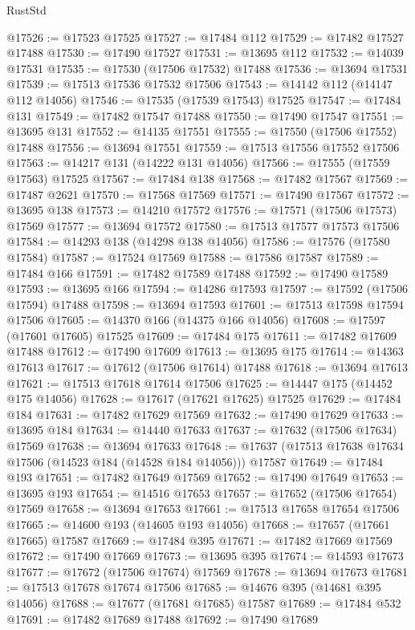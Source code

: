 \begin{lexlean}{RustStd}
\begin{coremodule}
@17526 := @17523 @17525
@17527 := @17484 @112
@17529 := @17482 @17527 @17488
@17530 := @17490 @17527
@17531 := @13695 @112
@17532 := @14039 @17531
@17535 := @17530 (@17506 @17532) @17488
@17536 := @13694 @17531
@17539 := @17513 @17536 @17532 @17506
@17543 := @14142 @112 (@14147 @112 @14056)
@17546 := @17535 (@17539 @17543) @17525
@17547 := @17484 @131
@17549 := @17482 @17547 @17488
@17550 := @17490 @17547
@17551 := @13695 @131
@17552 := @14135 @17551
@17555 := @17550 (@17506 @17552) @17488
@17556 := @13694 @17551
@17559 := @17513 @17556 @17552 @17506
@17563 := @14217 @131 (@14222 @131 @14056)
@17566 := @17555 (@17559 @17563) @17525
@17567 := @17484 @138
@17568 := @17482 @17567
@17569 := @17487 @2621
@17570 := @17568 @17569
@17571 := @17490 @17567
@17572 := @13695 @138
@17573 := @14210 @17572
@17576 := @17571 (@17506 @17573) @17569
@17577 := @13694 @17572
@17580 := @17513 @17577 @17573 @17506
@17584 := @14293 @138 (@14298 @138 @14056)
@17586 := @17576 (@17580 @17584)
@17587 := @17524 @17569
@17588 := @17586 @17587
@17589 := @17484 @166
@17591 := @17482 @17589 @17488
@17592 := @17490 @17589
@17593 := @13695 @166
@17594 := @14286 @17593
@17597 := @17592 (@17506 @17594) @17488
@17598 := @13694 @17593
@17601 := @17513 @17598 @17594 @17506
@17605 := @14370 @166 (@14375 @166 @14056)
@17608 := @17597 (@17601 @17605) @17525
@17609 := @17484 @175
@17611 := @17482 @17609 @17488
@17612 := @17490 @17609
@17613 := @13695 @175
@17614 := @14363 @17613
@17617 := @17612 (@17506 @17614) @17488
@17618 := @13694 @17613
@17621 := @17513 @17618 @17614 @17506
@17625 := @14447 @175 (@14452 @175 @14056)
@17628 := @17617 (@17621 @17625) @17525
@17629 := @17484 @184
@17631 := @17482 @17629 @17569
@17632 := @17490 @17629
@17633 := @13695 @184
@17634 := @14440 @17633
@17637 := @17632 (@17506 @17634) @17569
@17638 := @13694 @17633
@17648 := @17637 (@17513 @17638 @17634 @17506 (@14523 @184 (@14528 @184 @14056))) @17587
@17649 := @17484 @193
@17651 := @17482 @17649 @17569
@17652 := @17490 @17649
@17653 := @13695 @193
@17654 := @14516 @17653
@17657 := @17652 (@17506 @17654) @17569
@17658 := @13694 @17653
@17661 := @17513 @17658 @17654 @17506
@17665 := @14600 @193 (@14605 @193 @14056)
@17668 := @17657 (@17661 @17665) @17587
@17669 := @17484 @395
@17671 := @17482 @17669 @17569
@17672 := @17490 @17669
@17673 := @13695 @395
@17674 := @14593 @17673
@17677 := @17672 (@17506 @17674) @17569
@17678 := @13694 @17673
@17681 := @17513 @17678 @17674 @17506
@17685 := @14676 @395 (@14681 @395 @14056)
@17688 := @17677 (@17681 @17685) @17587
@17689 := @17484 @532
@17691 := @17482 @17689 @17488
@17692 := @17490 @17689

\end{coremodule}
\end{lexlean}
